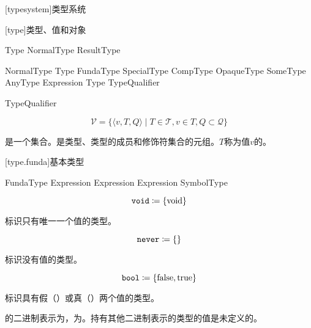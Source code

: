 
[typesystem]{类型系统}

[type]{类型、值和对象}

\begin{bnf}{Type}
    NormalType \br
    ResultType
\end{bnf}

\begin{bnf}{NormalType}
    \terminal{(} Type \terminal{)} \br
    FundaType \br
    SpecialType \br
    CompType \br
    OpaqueType \br
    SomeType \br
    AnyType \br
     \terminal{(} Expression \terminal{)} \br
    Type TypeQualifier
\end{bnf}

\begin{bnf}{TypeQualifier}
     \br
\end{bnf}

$$ \mathcal{V} = \{ \langle v, T, Q \rangle \mid T \in \mathcal{T}, v \in T, Q \subset \mathcal{Q} \} $$

\pnum
{}是一个集合。是类型、类型的成员和修饰符集合的元组。$T$称为值$v$的。

[type.funda]{基本类型}

\begin{bnf}{FundaType}
     \br
     \br
     \br
     \br
     \br
     \terminal{<} Expression \terminal{>} \br
     \terminal{<} Expression \terminal{>} \br
     \br
     \terminal{<} Expression \terminal{>} \br
     \br
     \br
    SymbolType
\end{bnf}

$$\texttt{void} \coloneqq \{ \mathrm{void} \}$$

\pnum
{}标识只有唯一一个值的类型。

$$\texttt{never} \coloneqq \{ \}$$

\pnum
{}标识没有值的类型。

$$\texttt{bool} \coloneqq \{ \mathrm{false}, \mathrm{true} \}$$

\pnum
{}标识具有假（）或真（）两个值的类型。

\pnum
{}的二进制表示为，为。持有其他二进制表示的类型的值是未定义的。

